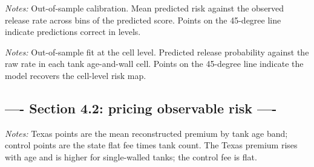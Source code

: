 \documentclass[
  12pt,
]{article}
\begin{document}
\clearpage
\null\vfill
\begin{center}
\label{fig-calibration}
\par\vspace{8pt}
\par\vspace{8pt}
\begin{minipage}{0.85\textwidth}\small\textit{Notes:} Out-of-sample calibration. Mean predicted risk against the observed release rate across bins of the predicted score. Points on the 45-degree line indicate predictions correct in levels.\end{minipage}
\end{center}
\vfill\clearpage

\clearpage
\null\vfill
\begin{center}
\label{fig-cell-gof}
\par\vspace{8pt}
\par\vspace{8pt}
\begin{minipage}{0.85\textwidth}\small\textit{Notes:} Out-of-sample fit at the cell level. Predicted release probability against the raw rate in each tank age-and-wall cell. Points on the 45-degree line indicate the model recovers the cell-level risk map.\end{minipage}
\end{center}
\vfill\clearpage

\subsection{---- Section 4.2: pricing observable risk
----}\label{section-4.2-pricing-observable-risk--}

\clearpage
\null\vfill
\begin{center}
\label{fig-premium-by-age}
\par\vspace{8pt}
\par\vspace{8pt}
\begin{minipage}{0.85\textwidth}\small\textit{Notes:} Texas points are the mean reconstructed premium by tank age band; control points are the state flat fee times tank count. The Texas premium rises with age and is higher for single-walled tanks; the control fee is flat.\end{minipage}
\end{center}
\vfill\clearpage
\end{document}
